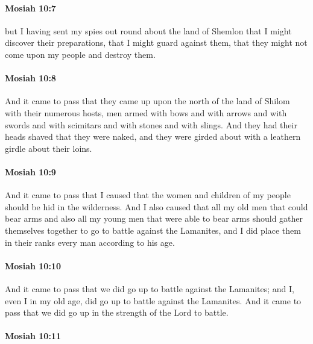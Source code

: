 		\paragraph{Mosiah 10:7} %
			\label{MOSIAH-10-7}

			but I having sent my spies out round about the land of Shemlon
			that I might discover their preparations,
			that I might guard against them,
			that they might not come upon my people and destroy them.

		\paragraph{Mosiah 10:8} %
			\label{MOSIAH-10-8}

			And it came to pass that they came up
			upon the north of the land of Shilom with their numerous hosts,
			men armed with bows and with arrows
			and with swords and with scimitars and with stones and with slings.
			And they had their heads shaved that they were naked,
			and they were girded about with a leathern girdle about their loins.

		\paragraph{Mosiah 10:9} %
			\label{MOSIAH-10-9}

			And it came to pass that I caused
			that the women and children of my people should be hid in the wilderness.
			And I also caused that all my old men that could bear arms
			and also all my young men that were able to bear arms
			should gather themselves together to go to battle against the Lamanites,
			and I did place them in their ranks every man according to his age.

		\paragraph{Mosiah 10:10} %
			\label{MOSIAH-10-10}

			And it came to pass that we did go up to battle against the Lamanites;
			and I, even I in my old age, did go up to battle against the Lamanites.
			And it came to pass that we did go up in the strength of the Lord to battle.

		\paragraph{Mosiah 10:11} %
			\label{MOSIAH-10-11}

